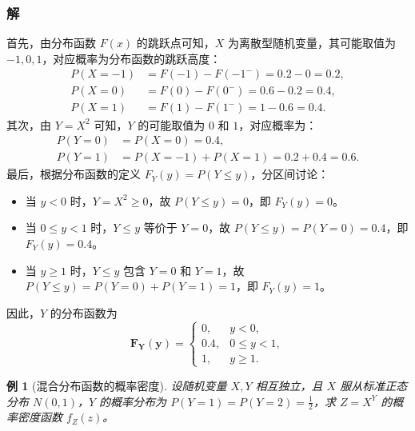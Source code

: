 \documentclass[11pt,a4paper,oneside,openany]{book}
\theoremstyle{yhbthm}
\newtheorem{example}{例}[section]
\begin{document}
\subsubsection{解}
首先，由分布函数 $F(x)$ 的跳跃点可知，$X$ 为离散型随机变量，其可能取值为 $-1, 0, 1$，对应概率为分布函数的跳跃高度：
\[
\begin{aligned}
P(X = -1) &= F(-1) - F(-1^-) = 0.2 - 0 = 0.2, \\
P(X = 0) &= F(0) - F(0^-) = 0.6 - 0.2 = 0.4, \\
P(X = 1) &= F(1) - F(1^-) = 1 - 0.6 = 0.4.
\end{aligned}
\]
其次，由 $Y = X^2$ 可知，$Y$ 的可能取值为 $0$ 和 $1$，对应概率为：
\[
\begin{aligned}
P(Y = 0) &= P(X = 0) = 0.4, \\
P(Y = 1) &= P(X = -1) + P(X = 1) = 0.2 + 0.4 = 0.6.
\end{aligned}
\]
最后，根据分布函数的定义 $F_Y(y) = P(Y \le y)$，分区间讨论：
\begin{itemize}
  \item 当 $y < 0$ 时，$Y = X^2 \ge 0$，故 $P(Y \le y) = 0$，即 $F_Y(y) = 0$。
  \item 当 $0 \le y < 1$ 时，$Y \le y$ 等价于 $Y = 0$，故 $P(Y \le y) = P(Y = 0) = 0.4$，即 $F_Y(y) = 0.4$。
  \item 当 $y \ge 1$ 时，$Y \le y$ 包含 $Y = 0$ 和 $Y = 1$，故 $P(Y \le y) = P(Y = 0) + P(Y = 1) = 1$，即 $F_Y(y) = 1$。
\end{itemize}
因此，$Y$ 的分布函数为
\[
\boldsymbol{F_Y(y)} =
\begin{cases}
0, & y < 0, \\
0.4, & 0 \le y < 1, \\
1, & y \ge 1.
\end{cases}
\]

\begin{example}[混合分布函数的概率密度]
设随机变量 $X,Y$ 相互独立，且 $X$ 服从标准正态分布 $N(0,1)$，$Y$ 的概率分布为 $P(Y=1) = P(Y=2) = \frac{1}{2}$，求 $Z = X^Y$ 的概率密度函数 $f_Z(z)$。
\end{example}
\end{document}
